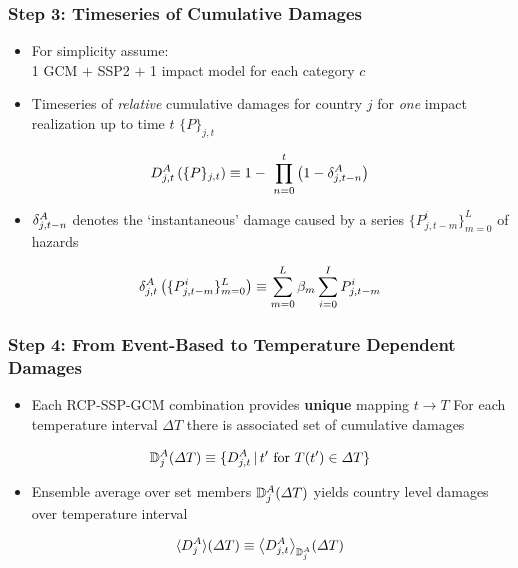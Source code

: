 \documentclass[
c,
11pt,
aspectratio=169, %
final,
]{beamer}
\begin{document}
\begin{frame}
  \frametitle{Step 3: Timeseries of Cumulative Damages}
      \begin{minipage}[l]{\linewidth}
        \begin{itemize}
  \item For simplicity assume:\\ 1 GCM $+$ SSP2 $+$ 1 impact model for each category $c$          
  \item Timeseries of \emph{relative} cumulative damages for country $j$ for \emph{one} impact realization up to time $t$ $\lbrace P\rbrace_{j,t}$  
  \end{itemize}
  \begin{equation*}
     \DA_{j,t}\left(\lbrace P\rbrace_{j,t}\right)\equiv 1 - \ \prod_{n=0}^{t}\left(1-\dA_{j,t-n}\right)
   \end{equation*}
   \begin{itemize}
\item  $\delta^A_{j,t-n}$ denotes the `instantaneous' damage caused by a series $\lbrace P_{j,t-m}^i\rbrace_{m=0}^L$ of hazards   
   \end{itemize}
  \begin{equation*}
    \delta^A_{j,t}\left(\lbrace P_{j,t-m}^i\rbrace_{m=0}^L\right)\equiv \sum_{m=0}^L\beta_m\sum_{i=0}^IP_{j,t-m}^i
  \end{equation*}

\end{minipage}\hfill
\begin{minipage}[r]{0\linewidth}
\end{minipage}
\end{frame}

\begin{frame}
  \frametitle{Step 4: From Event-Based to Temperature Dependent Damages}
  \begin{itemize}
  \item Each RCP-SSP-GCM combination provides \textbf{unique} mapping $t \rightarrow T$
    \arrowitem For each temperature interval $\Delta T$ there is associated set of cumulative damages
  \end{itemize}
    \begin{equation*}
   \mathbb{D}^A_{j}(\Delta T)\equiv\lbrace D^A_{j,t}\, \vert\, t' \text{ for } T(t')\in\Delta T \rbrace
\end{equation*}
\begin{itemize}
\item Ensemble average over set members $\mathbb{D}^A_{j}(\Delta T)$ yields country level damages over temperature interval  
\end{itemize}
\begin{equation*}
  \langle D^A_{j}\rangle(\Delta T)\equiv\big\langle D^A_{j,t}\big\rangle_{\mathbb{D}^A_{j}}(\Delta T)
\end{equation*}
\end{frame}
\end{document}
